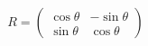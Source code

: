 \documentclass[preview]{standalone}
\begin{document}
\begin{align*}
R = \begin{pmatrix} \cos\theta & -\sin\theta \\ \sin\theta & \cos\theta \end{pmatrix}
\end{align*}
\end{document}
